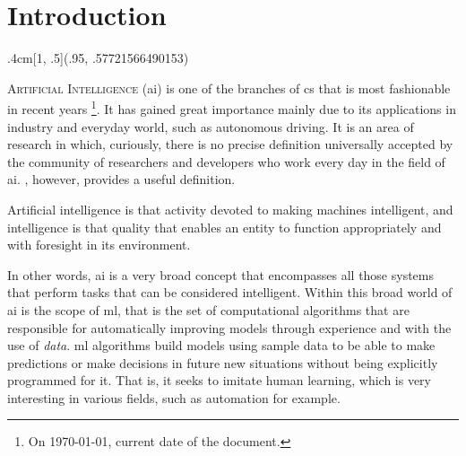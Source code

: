 

\chapter{Introduction}\label{cha:intro}

\begin{textblock*}{.4cm}[1, .5](.95\layoutwidth, .57721566490153\layoutheight)
  \noindent\resizebox{.4cm}{!}{\(\gamma\)}
\end{textblock*}



\lettrine{A}{rtificial Intelligence} (\acs{ai}) is one of the branches of \gls{cs} that is most fashionable in
recent years%
\footnote{On \today, current date of the document.}. It has gained great
importance mainly due to its applications in industry and everyday world, such
as autonomous driving. It is an area of research in which, curiously, there is
no precise definition universally accepted by the community of researchers and
developers who work every day in the field of
\gls{ai}. , however, provides a useful
definition.

\begin{quoteBox}
  Artificial intelligence is that activity devoted to making machines
  intelligent, and intelligence is that quality that enables an entity to
  function appropriately and with foresight in its environment.
  \tcblower{}
\end{quoteBox}

In other words, \gls{ai} is a very broad concept that encompasses all those
systems that perform tasks that can be considered intelligent. Within this
broad world of \gls{ai} is the scope of \gls{ml}, that
is the set of computational algorithms that are responsible for automatically
improving models through experience and with the use of \emph{data}. \Gls{ml}
algorithms build models using sample data to be able to make predictions or
make decisions in future new situations without being explicitly programmed for
it. That is, it seeks to imitate human learning, which is very interesting in
various fields, such as automation for example.

